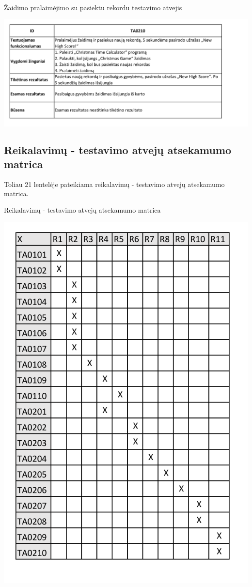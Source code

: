 \documentclass{VUMIFPSkursinis}
\begin{document}
				\begin{table}[H]
					\centering
					\caption{Žaidimo pralaimėjimo su pasiektu rekordu testavimo atvejis}
					\includegraphics[width=\textwidth]{TA/TA0210}			
					\label{fig:TA0210}
				\end{table}
		\subsection{Reikalavimų - testavimo atvejų atsekamumo matrica} \label{atsekamumo matrica}
			Toliau 21 lentelėje pateikiama reikalavimų - testavimo atvejų atsekamumo matrica.
			\begin{table}[H]
				\centering
				\caption{Reikalavimų - testavimo atvejų atsekamumo matrica}
				\includegraphics[width=\textwidth]{TA/AtsekamumoMatrica}			
				\label{fig:AtsekamumoMatrica}
			\end{table}
\end{document}
